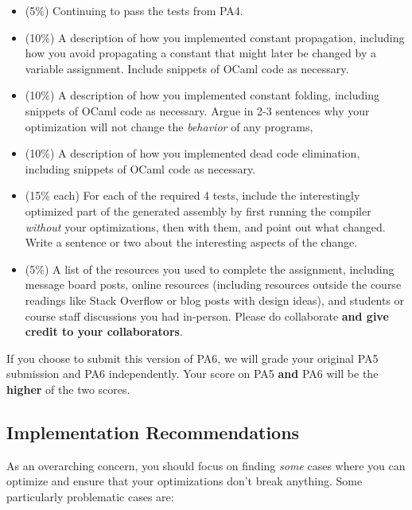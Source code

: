 \documentclass[10pt, oneside]{article}
\begin{document}
\begin{itemize}

  \item (5\%) Continuing to pass the tests from PA4.

  \item (10\%) A description of how you implemented constant propagation,
  including how you avoid propagating a constant that might later be changed
  by a variable assignment. Include snippets of OCaml code as necessary.

  \item (10\%) A description of how you implemented constant folding, including
  snippets of OCaml code as necessary. Argue in 2-3 sentences why your
  optimization will not change the {\it behavior} of any programs, 

  \item (10\%) A description of how you implemented dead code elimination,
  including snippets of OCaml code as necessary.

  \item (15\% each) For each of the required 4 tests, include the
  interestingly optimized part of the generated assembly by first running the
  compiler {\it without} your optimizations, then with them, and point out
  what changed. Write a sentence or two about the interesting aspects of the
  change.

  \item (5\%) A list of the resources you used to complete the assignment,
  including message board posts, online resources (including resources
  outside the course readings like Stack Overflow or blog posts with design
  ideas), and students or course staff discussions you had in-person. Please
  do collaborate {\bf and give credit to your collaborators}.
\end{itemize}

If you choose to submit this version of PA6, we will grade your original PA5
submission and PA6 independently. Your score on PA5 {\bf and} PA6 will be the
{\bf higher} of the two scores.

\subsection*{Implementation Recommendations}

As an overarching concern, you should focus on finding {\it some} cases where
you can optimize and ensure that your optimizations don't break anything.
Some particularly problematic cases are:
\end{document}
